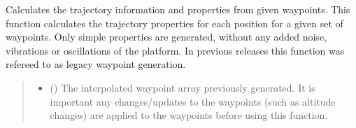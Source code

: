 \documentclass[letterpaper,10pt,english]{sphinxmanual}
\begin{document}
\begin{fulllineitems}
\label{\detokenize{modules/waypoints/generation:qnav.waypoints.generation.get_simple_trajectory_values}}
\pysigstartsignatures
{}
\pysigstopsignatures
\sphinxAtStartPar
Calculates the trajectory information and properties from given waypoints.
This function calculates the trajectory properties for each position for
a given set of waypoints. Only simple properties are generated, without
any added noise, vibrations or oscillations of the platform. In previous
releases this function was refereed to as legacy waypoint generation.
\begin{quote}\begin{description}
\begin{itemize}
\item {} 
\sphinxAtStartPar
{} (\sphinxstyleliteralemphasis{\sphinxupquote{ (}}\sphinxstyleliteralemphasis{\sphinxupquote{)}}) \textendash{} The interpolated waypoint array previously generated. It
is important any changes/updates to the waypoints (such as altitude
changes) are applied to the waypoints before using this function.


\end{itemize}
\end{description}
\end{quote}
\end{fulllineitems}
\end{document}
